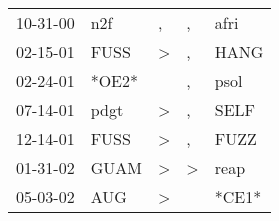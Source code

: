 \begin{supertabular}{p{0.07\textwidth}p{0.06\textwidth}p{0.02\textwidth}p{0.02\textwidth}p{0.06\textwidth}}
 10-31-00\textsuperscript{} &   n2f\textsuperscript{} &             , &             , &  afri\textsuperscript{} \\
 02-15-01\textsuperscript{} &  FUSS\textsuperscript{} &  \textgreater &             , &  HANG\textsuperscript{} \\
 02-24-01\textsuperscript{} &                   *OE2* &               &             , &  psol\textsuperscript{} \\
 07-14-01\textsuperscript{} &  pdgt\textsuperscript{} &  \textgreater &             , &  SELF\textsuperscript{} \\
 12-14-01\textsuperscript{} &  FUSS\textsuperscript{} &  \textgreater &             , &  FUZZ\textsuperscript{} \\
 01-31-02\textsuperscript{} &  GUAM\textsuperscript{} &  \textgreater &  \textgreater &  reap\textsuperscript{} \\
 05-03-02\textsuperscript{} &   AUG\textsuperscript{} &  \textgreater &               &                   *CE1* \\
\end{supertabular}
